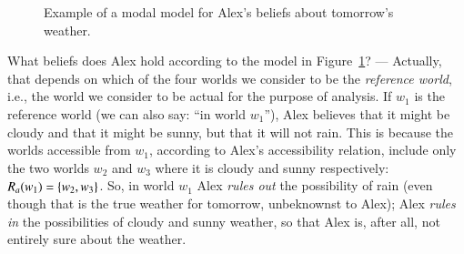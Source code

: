 \documentclass[nobib,nofonts]{tufte-handout}
\begin{document}
\begin{figure}
  \centering
  \caption{Example of a modal model for Alex's beliefs about tomorrow's weather.}
  \label{fig:modal-model-single-agent}
\end{figure}

What beliefs does Alex hold according to the model in Figure~\ref{fig:modal-model-single-agent}? ---
Actually, that depends on which of the four worlds we consider to be the \emph{reference world}, i.e., the world we consider to be actual for the purpose of analysis.
If $w_{1}$ is the reference world (we can also say: ``in world $w_{1}$''), Alex believes that it might be cloudy and that it might be sunny, but that it will not rain.
This is because the worlds accessible from $w_{1}$, according to Alex's accessibility relation, include only the two worlds $w_{2}$ and $w_{3}$ where it is cloudy and sunny respectively: $R_{a}(w_{1}) = \left\{w_{2}, w_{3}\right\}$.
So, in world $w_{1}$ Alex \emph{rules out} the possibility of rain (even though that is  the true weather for tomorrow, unbeknownst to Alex); Alex \emph{rules in} the possibilities of cloudy and sunny weather, so that Alex is, after all, not entirely sure about the weather.
\end{document}
